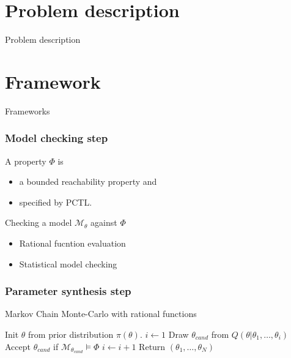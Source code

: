 \documentclass{beamer}
\begin{document}

\section{Problem description}
\begin{frame}
    \begin{center}
        \Huge Problem description
    \end{center}
\end{frame}

\section{Framework}
\begin{frame}
    \begin{center}
        \Huge Frameworks
    \end{center}
\end{frame}

\begin{frame}
    \frametitle{Model checking step}
    A property $\Phi$ is
    \begin{itemize}
        \item a bounded reachability property and
        \item specified by PCTL.
    \end{itemize}
    Checking a model $\mathcal{M}_\theta$ against $\Phi$
    \begin{itemize}
        \item Rational fucntion evaluation
        \item Statistical model checking
    \end{itemize}
\end{frame}

\begin{frame}
    \frametitle{Parameter synthesis step}
    \begin{algorithm}[H]
        \caption{Markov Chain Monte-Carlo with rational functions}
        \label{rf-mcmc-alg}
        \begin{algorithmic}[1]
            \State Init $\theta$ from prior distribution $\pi(\theta)$.
            \State $i \leftarrow 1$
            \State Draw $\theta_{cand}$ from $Q(\theta|\theta_1,\ldots,\theta_i)$
            \State Accept $\theta_{cand}$ if $\mathcal{M}_{\theta_{cand}} \models \Phi$
            \State $i \leftarrow i + 1$
            \EndIf
            \EndWhile
            \State Return $(\theta_1,\ldots,\theta_N)$
            \EndProcedure
        \end{algorithmic}
    \end{algorithm}
\end{frame}
\end{document}
